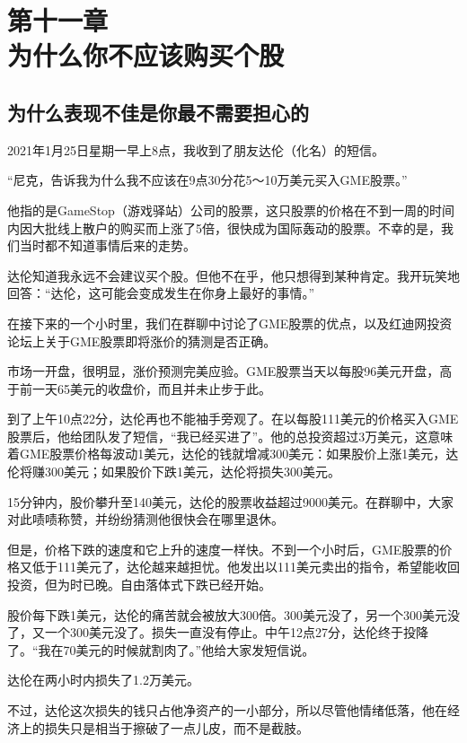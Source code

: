 \section[第十一章\q 为什么你不应该购买个股]{第十一章\\ 为什么你不应该购买个股}
\renewcommand{\bookchapter}{11}
\setcounter{figure}{0}
\setcounter{table}{0}
\subsection{为什么表现不佳是你最不需要担心的}
2021年1月25日星期一早上8点，我收到了朋友达伦（化名）的短信。

“尼克，告诉我为什么我不应该在9点30分花5～10万美元买入GME股票。”

他指的是GameStop（游戏驿站）公司的股票，这只股票的价格在不到一周的时间内因大批线上散户的购买而上涨了5倍，很快成为国际轰动的股票。不幸的是，我们当时都不知道事情后来的走势。

达伦知道我永远不会建议买个股。但他不在乎，他只想得到某种肯定。我开玩笑地回答：“达伦，这可能会变成发生在你身上最好的事情。”

在接下来的一个小时里，我们在群聊中讨论了GME股票的优点，以及红迪网投资论坛上关于GME股票即将涨价的猜测是否正确。

市场一开盘，很明显，涨价预测完美应验。GME股票当天以每股96美元开盘，高于前一天65美元的收盘价，而且并未止步于此。

到了上午10点22分，达伦再也不能袖手旁观了。在以每股111美元的价格买入GME股票后，他给团队发了短信，“我已经买进了”。他的总投资超过3万美元，这意味着GME股票价格每波动1美元，达伦的钱就增减300美元：如果股价上涨1美元，达伦将赚300美元；如果股价下跌1美元，达伦将损失300美元。

15分钟内，股价攀升至140美元，达伦的股票收益超过9000美元。在群聊中，大家对此啧啧称赞，并纷纷猜测他很快会在哪里退休。

但是，价格下跌的速度和它上升的速度一样快。不到一个小时后，GME股票的价格又低于111美元了，达伦越来越担忧。他发出以111美元卖出的指令，希望能收回投资，但为时已晚。自由落体式下跌已经开始。

股价每下跌1美元，达伦的痛苦就会被放大300倍。300美元没了，另一个300美元没了，又一个300美元没了。损失一直没有停止。中午12点27分，达伦终于投降了。“我在70美元的时候就割肉了。”他给大家发短信说。

达伦在两小时内损失了1.2万美元。

不过，达伦这次损失的钱只占他净资产的一小部分，所以尽管他情绪低落，他在经济上的损失只是相当于擦破了一点儿皮，而不是截肢。

